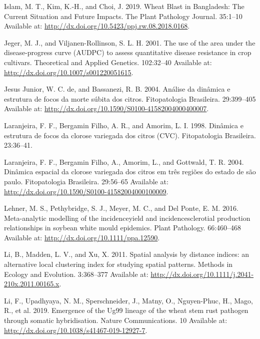 \documentclass[
  letterpaper,
  DIV=11,
  numbers=noendperiod]{scrreprt}
\newlength{\cslhangindent}
\newlength{\cslentryspacingunit} %
\newenvironment{CSLReferences}[2] %
 {%
  \setlength{\parindent}{0pt}
  \ifodd #1
  \let\oldpar\par
  \def\par{\hangindent=\cslhangindent\oldpar}
  \fi
  \setlength{\parskip}{#2\cslentryspacingunit}
 }%
 {}
\begin{document}
\begin{CSLReferences}{0}{0}
\leavevmode{}%
Islam, M. T., Kim, K.-H., and Choi, J. 2019. Wheat Blast in Bangladesh:
The Current Situation and Future Impacts. The Plant Pathology Journal.
35:1--10 Available at:
\url{http://dx.doi.org/10.5423/ppj.rw.08.2018.0168}.

\leavevmode{}%
Jeger, M. J., and Viljanen-Rollinson, S. L. H. 2001. The use of the area
under the disease-progress curve (AUDPC) to assess quantitative disease
resistance in crop cultivars. Theoretical and Applied Genetics.
102:32--40 Available at: \url{http://dx.doi.org/10.1007/s001220051615}.

\leavevmode{}%
Jesus Junior, W. C. de, and Bassanezi, R. B. 2004. Análise da dinâmica e
estrutura de focos da morte súbita dos citros. Fitopatologia Brasileira.
29:399--405 Available at:
\url{http://dx.doi.org/10.1590/S0100-41582004000400007}.

\leavevmode{}%
Laranjeira, F. F., Bergamin Filho, A. R., and Amorim, L. I. 1998.
Din{â}mica e estrutura de focos da clorose variegada dos citros (CVC).
Fitopatologia Brasileira. 23:36--41.

\leavevmode{}%
Laranjeira, F. F., Bergamin Filho, A., Amorim, L., and Gottwald, T. R.
2004. Dinâmica espacial da clorose variegada dos citros em três regiões
do estado de são paulo. Fitopatologia Brasileira. 29:56--65 Available
at: \url{http://dx.doi.org/10.1590/S0100-41582004000100009}.

\leavevmode{}%
Lehner, M. S., Pethybridge, S. J., Meyer, M. C., and Del Ponte, E. M.
2016. Meta{-}analytic modelling of the incidence{\textendash}yield and
incidence{\textendash}sclerotial production relationships in soybean
white mould epidemics. Plant Pathology. 66:460--468 Available at:
\url{http://dx.doi.org/10.1111/ppa.12590}.

\leavevmode{}%
Li, B., Madden, L. V., and Xu, X. 2011. Spatial analysis by distance
indices: an alternative local clustering index for studying spatial
patterns. Methods in Ecology and Evolution. 3:368--377 Available at:
\url{http://dx.doi.org/10.1111/j.2041-210x.2011.00165.x}.

\leavevmode{}%
Li, F., Upadhyaya, N. M., Sperschneider, J., Matny, O., Nguyen-Phuc, H.,
Mago, R., et al. 2019. Emergence of the Ug99 lineage of the wheat stem
rust pathogen through somatic hybridisation. Nature Communications. 10
Available at: \url{http://dx.doi.org/10.1038/s41467-019-12927-7}.


\end{CSLReferences}
\end{document}
